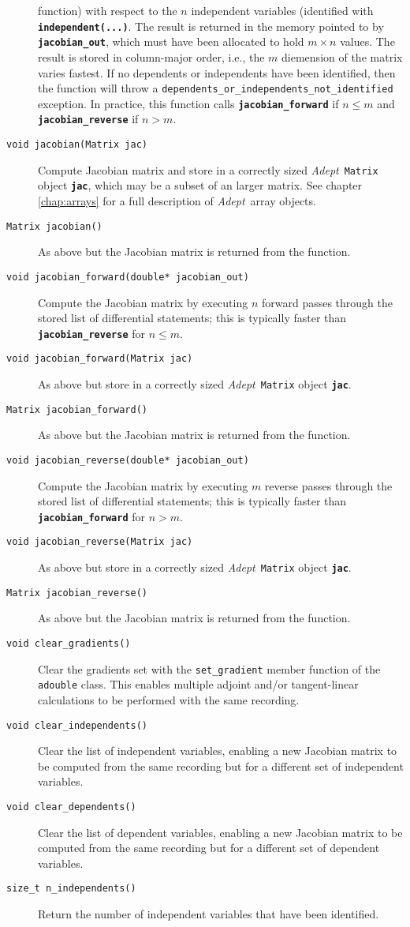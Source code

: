 \documentclass[a4,oneside]{book}
\def\codesize{\small}
\def\Adept{\emph{Adept}}
\def\code#1{{\codesize\texttt{#1}}}
\def\codebf#1{{\codesize\texttt{\textbf{#1}}}}
\def\citem#1{\item[{\codesize\texttt{#1}}]}
\def\Offset{size\_t}
\begin{document}
\begin{description}
function) with respect to the $n$ independent variables (identified
with \codebf{independent(...)}. The result is returned in the memory
pointed to by \codebf{jacobian\_out}, which must have been allocated
to hold $m\times n$ values. The result is stored in
column-major order, i.e., the $m$ diemension of the matrix varies
fastest. If no dependents or independents have been identified,
then the function will throw a
\code{dependents\_or\_independents\_not\_identified} exception. In
practice, this function calls \codebf{jacobian\_forward} if $n\le
m$ and \codebf{jacobian\_reverse} if $n>m$.
%
\citem{void jacobian(Matrix jac)} Compute Jacobian matrix and store in
a correctly sized \Adept\ \code{Matrix} object \codebf{jac}, which may
be a subset of an larger matrix. See chapter \ref{chap:arrays} for a
full description of \Adept\ array objects.
%
\citem{Matrix jacobian()} As above but the Jacobian matrix is returned
from the function.
%
\citem{void jacobian\_forward(double* jacobian\_out)} Compute the
Jacobian matrix by executing $n$ forward passes through the stored
list of differential statements; this is typically faster than
\codebf{jacobian\_reverse} for $n\le m$.
%
\citem{void jacobian\_forward(Matrix jac)} As above but store in a
correctly sized \Adept\ \code{Matrix} object \codebf{jac}.
%
\citem{Matrix jacobian\_forward()} As above but the Jacobian matrix is
returned from the function.
%
\citem{void jacobian\_reverse(double* jacobian\_out)} Compute the
Jacobian matrix by executing $m$ reverse passes through the stored
list of differential statements; this is typically faster than
\codebf{jacobian\_forward} for $n>m$.
%
\citem{void jacobian\_reverse(Matrix jac)} As above but store in a
correctly sized \Adept\ \code{Matrix} object \codebf{jac}.
%
\citem{Matrix jacobian\_reverse()} As above but the Jacobian matrix is
returned from the function.
%
\citem{void clear\_gradients()} Clear the gradients set with the
\code{set\_gradient} member function of the \code{adouble} class. This
enables multiple adjoint and/or tangent-linear calculations to be
performed with the same recording.
%
\citem{void clear\_independents()} Clear the list of independent
variables, enabling a new Jacobian matrix to be computed from the same
recording but for a different set of independent variables.
%
\citem{void clear\_dependents()} Clear the list of dependent
variables, enabling a new Jacobian matrix to be computed from the same
recording but for a different set of dependent variables.
%
\citem{\Offset\ n\_independents()} Return the number of independent
variables that have been identified.

\end{description}
\end{document}
